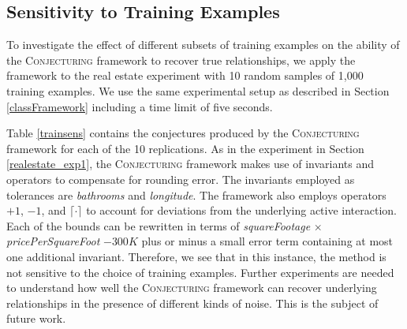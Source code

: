 \documentclass[ijds,nonblindrev]{informs-ijds}
\begin{document}
\subsection{Sensitivity to Training Examples}

To investigate the effect of different subsets of training examples on the ability of the \textsc{Conjecturing} framework to recover true relationships, we apply the framework to the real estate experiment with 10 random samples of 1,000 training examples.   We use the same experimental setup as described in Section \ref{classFramework} including a time limit of five seconds.

Table \ref{trainsens} contains the conjectures produced by the \textsc{Conjecturing} framework for each of the 10 replications.  As in the experiment in Section \ref{realestate_exp1}, the \textsc{Conjecturing} framework makes use of invariants and operators to compensate for rounding error.  The invariants employed as tolerances are {\it bathrooms} and {\it longitude}.  The framework also employs operators $+1$, $-1$, and $\lceil \cdot \rceil$ to account for deviations from the underlying active interaction.  Each of the bounds can be rewritten in terms of {\it squareFootage} $\times$ {\it pricePerSquareFoot} $-300K$ plus or minus a small error term containing at most one additional invariant.  Therefore, we see that in this instance, the method is not sensitive to the choice of training examples.  Further experiments are needed to understand how well the \textsc{Conjecturing} framework can recover underlying relationships in the presence of different kinds of noise.  This is the subject of future work.     
\end{document}
